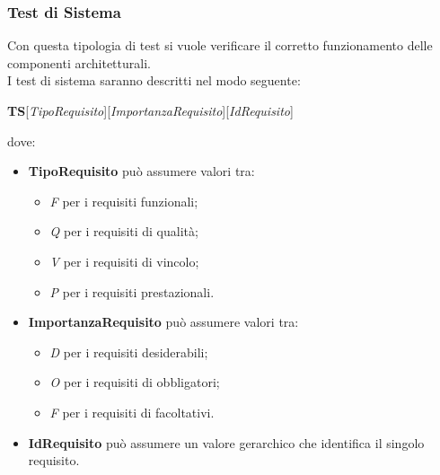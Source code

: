\subsubsection{Test di Sistema}
Con questa tipologia di test si vuole verificare il corretto funzionamento delle componenti architetturali.\\
I test di sistema saranno descritti nel modo seguente:
\begin{center}
\textbf{TS}[\textit{TipoRequisito}][\textit{ImportanzaRequisito}][\textit{IdRequisito}]
\end{center}
dove:
\begin{itemize}
\item \textbf{TipoRequisito} può assumere valori tra:
\begin{itemize}
\item \textit{F} per i requisiti funzionali;
\item \textit{Q} per i requisiti di qualità;
\item \textit{V} per i requisiti di vincolo;
\item \textit{P} per i requisiti prestazionali.
\end{itemize}
\item \textbf{ImportanzaRequisito} può assumere valori tra:
\begin{itemize}
\item \textit{D} per i requisiti desiderabili;
\item \textit{O} per i requisiti di obbligatori;
\item \textit{F} per i requisiti di facoltativi.
\end{itemize}
\item \textbf{IdRequisito} può assumere un valore gerarchico che identifica il singolo requisito.
\end{itemize}

